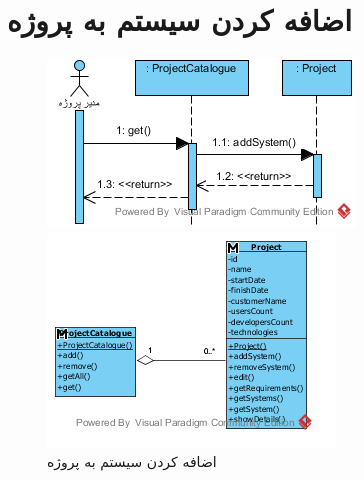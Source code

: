 \section{اضافه کردن سیستم به پروژه}
\begin{figure}[H]
	\centering
	\includegraphics[scale=0.8]{img/sequence-analysis/AddSystemToProject}
	
	
	\includegraphics[scale=0.8]{img/sequence-analysis/AddSystemToProjectC}
	\caption{اضافه کردن سیستم به پروژه}
\end{figure}

